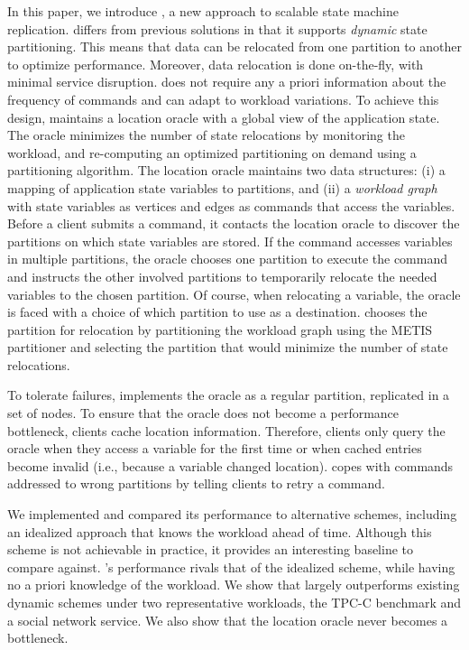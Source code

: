 In this paper, we introduce \dynastar, a new approach to scalable state machine replication.
\dynastar differs from previous solutions in that it supports \emph{dynamic} state partitioning.
This means that data can be relocated from one partition to another to optimize performance.
Moreover, data relocation is done on-the-fly, with minimal service disruption.
\dynastar does not require any a priori information about the frequency of commands and can adapt to workload variations.
To achieve this design, \dynastar maintains a
location oracle with a global view of the application state.  The oracle minimizes the
number of state relocations by monitoring the workload, and
re-computing an optimized partitioning on demand using a 
partitioning algorithm.  
The location oracle maintains two data structures: (i) a mapping of application state variables to partitions, and (ii) a \emph{workload graph} with state variables as vertices and edges as commands that access the variables.  
Before a client submits a command, it contacts the
location oracle to discover the partitions on which state variables are
stored.  If the command accesses variables in multiple partitions, the
oracle chooses one partition to execute the command and instructs the other involved partitions to temporarily relocate 
the needed variables to the chosen partition. Of course, when relocating a variable, the oracle
is faced with a choice of which partition to use as a destination.
\dynastar chooses the partition for relocation by partitioning the
workload graph using the METIS partitioner and selecting the partition that 
would minimize the number of state relocations.

To tolerate failures, \dynastar implements the oracle as a regular partition, replicated in a set of nodes.
To ensure that the oracle does not become a performance bottleneck, clients cache location information.
Therefore, clients only query the oracle when they access a variable for the first time or when cached entries become invalid (i.e., because a variable changed location).
\dynastar copes with commands addressed to wrong partitions by telling clients to retry a command.

We implemented \dynastar and compared its performance to
alternative schemes, including an idealized approach that knows the workload ahead of time.
Although this scheme is not achievable in practice, it provides an interesting baseline to compare against.
\dynastar's performance rivals that of the idealized scheme, while having no a priori knowledge of the workload.
We show that \dynastar largely outperforms existing dynamic schemes under two representative workloads, the TPC-C benchmark and a social network service.
We also show that the location oracle never becomes a bottleneck.


